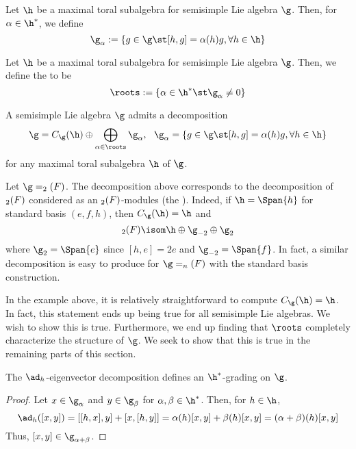\documentclass[11pt,leqno,oneside]{amsart}
\numberwithin{thm}{section}
\begin{document}
\begin{defn}
  Let \(\h\) be a maximal toral subalgebra for semisimple Lie algebra
  \(\g\). Then, for \(\alpha \in \h^*\), we define \[
    \g_\alpha := \{g \in \g \st [h,g] = \alpha(h)g, \forall h \in \h\}
  \]
\end{defn}
\begin{defn}
  Let \(\h\) be a maximal toral subalgebra for semisimple Lie algebra
  \(\g\). Then, we define the 
  to be \[
    \roots := \{\alpha \in \h^* \st \g_\alpha \neq 0\}
  \]
\end{defn}
\begin{thm}
  A semisimple Lie algebra \(\g\) admits a decomposition \[
    \g = C_\g(\h) \oplus \bigoplus_{\alpha \in \roots} \g_\alpha, \ \
    \g_\alpha = \{g \in \g \st [h,g] = \alpha(h)g, \forall h \in \h\}
  \]
  for any maximal toral subalgebra \(\h\) of \(\g\).
\end{thm}
\begin{example}
  Let \(\g = \sl_2(F)\). The decomposition above corresponds to
  the decomposition of \(\sl_2(F)\) considered as an
  \(\sl_2(F)\)-modules (the ). Indeed, if
  \(\h = \Span\{h\}\) for standard basis \((e,f,h)\), then \(C_\g(\h)
  = \h\) and \[
    \sl_2(F) \isom \h \oplus \g_{-2} \oplus \g_2
  \]
  where \(\g_2 = \Span\{e\}\) since \([h,e] = 2e\) and \(\g_{-2} =
  \Span\{f\}\). In fact, a similar decomposition is easy to produce
  for \(\g = \sl_n(F)\) with the standard basis construction.
\end{example}
\begin{rmk}
  In the example above, it is relatively straightforward to compute
\(C_\g(\h) = \h\). In fact, this statement ends up being true for all
semisimple Lie algebras. We wish to show this is true. Furthermore, we
end up finding that \(\roots\) completely characterize the structure
of \(\g\). We seek to show that this is true in the remaining parts of
this section.
\end{rmk}
\begin{prop}
  The \(\ad_h\)-eigenvector decomposition defines an \(\h^*\)-grading
  on \(\g\).
\end{prop}
\begin{proof}
  Let \(x \in \g_\alpha\) and \(y \in \g_\beta\) for \(\alpha,\beta
  \in \h^*\). Then, for \(h \in \h\), \[
    \ad_h([x,y]) = [[h,x],y] + [x,[h,y]] = \alpha(h)[x,y] +
    \beta(h)[x,y] = (\alpha+\beta)(h)[x,y]
  \]
  Thus, \([x,y] \in \g_{\alpha+\beta}\).
\end{proof}
\end{document}
